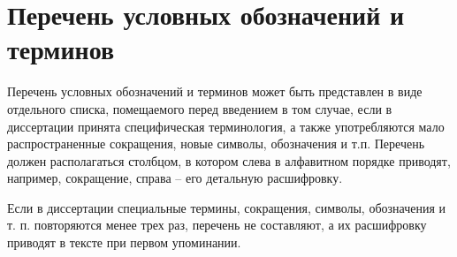 \chapter*{Перечень условных обозначений и терминов}

Перечень условных обозначений и терминов может быть представлен в виде
отдельного списка, помещаемого перед введением в том случае,
если в диссертации принята  специфическая терминология,
а также употребляются мало распространенные сокращения,
новые символы, обозначения и т.п.
Перечень должен располагаться столбцом, в котором слева в алфавитном
порядке приводят, например, сокращение, справа – его детальную расшифровку.

Если в диссертации специальные термины, сокращения, символы, обозначения и т. п.
повторяются менее трех раз, перечень не составляют,
а их расшифровку приводят в тексте при первом упоминании.